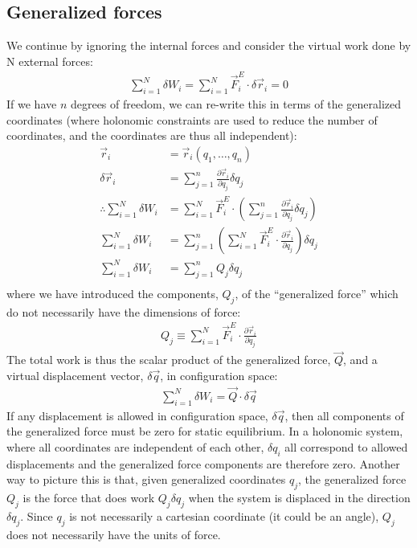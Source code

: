 \subsection{Generalized forces}
We continue by ignoring the internal forces and consider the virtual work done by N external forces:
\begin{align}
\sum_{i=1}^N\delta W_i=\sum_{i=1}^N \vec{F}^E_i\cdot\delta\vec{r}_i = 0 
\end{align}
If we have $n$ degrees of freedom, we can re-write this in terms of the generalized coordinates (where holonomic constraints are used to reduce the number of coordinates, and the coordinates are thus all independent):
\begin{align}
\vec{r}_i&=\vec{r}_i(q_1,\dots , q_n)\nonumber\\
\delta \vec{r}_i&= \sum_{j=1}^n\frac{\partial\vec{r}_i}{\partial q_j}\delta q_j\nonumber\\
\therefore \sum_{i=1}^N\delta W_i&=\sum_{i=1}^N\vec{F}^E_i\cdot\left(\sum_{j=1}^n\frac{\partial\vec{r}_i}{\partial q_j}\delta q_j\right)\nonumber\\
\sum_{i=1}^N\delta W_i&=\sum_{j=1}^n\left(\sum_{i=1}^N\vec{F}^E_i\cdot\frac{\partial\vec{r}_i}{\partial q_j}\right)\delta q_j\nonumber\\
\sum_{i=1}^N\delta W_i&=\sum_{j=1}^nQ_j\delta q_j\nonumber\\
\end{align}
where we have introduced the components, $Q_j$, of the ``generalized force'' which do not necessarily have the dimensions of force:
\begin{align}
Q_j\equiv \sum_{i=1}^N\vec{F}^E_i\cdot\frac{\partial\vec{r}_i}{\partial q_j}
\label{eqn:genforce}
\end{align}
The total work is thus the scalar product of the generalized force, $\vec Q$, and a virtual displacement vector, $\delta \vec q$, in configuration space:
\begin{align}
\sum_{i=1}^N\delta W_i=\vec{Q}\cdot\delta\vec{q}
\end{align}
If any displacement is allowed in configuration space, $\delta \vec{q}$, then all components of the generalized force must be zero for static equilibrium. In a holonomic system, where all coordinates are independent of each other, $\delta {q}_i$ all correspond to allowed displacements and the generalized force components are therefore zero. Another way to picture this is that, given generalized coordinates $q_j$, the generalized force $Q_j$ is the force that does work $Q_j \delta q_j$ when the system is displaced in the direction $\delta q_j$. Since $q_j$ is not necessarily a cartesian coordinate (it could be an angle),  $Q_j$ does not necessarily have the units of force.

